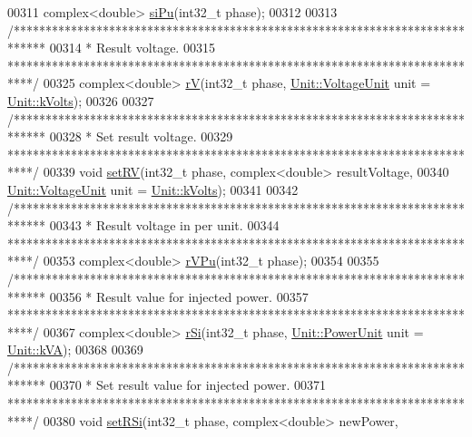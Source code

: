 \begin{DoxyCode}
00311   complex<double> \hyperlink{group___models_ga8ac94a6b5f69417da962a7d87361b416}{siPu}(int32\_t phase);
00312 
00313   \textcolor{comment}{/*****************************************************************************}
00314 \textcolor{comment}{   * Result voltage.}
00315 \textcolor{comment}{   ****************************************************************************/}
00325   complex<double> \hyperlink{group___models_ga2d1f6bfbd8abaf168bb75bd8e5cd9b5e}{rV}(int32\_t phase, \hyperlink{class_unit_a55b07dfa9457e1eca2c7194fe0cfc3c1}{Unit::VoltageUnit} unit = 
      \hyperlink{class_unit_a55b07dfa9457e1eca2c7194fe0cfc3c1aa54b2473993a702a3923525765bd6e4c}{Unit::kVolts});
00326 
00327   \textcolor{comment}{/*****************************************************************************}
00328 \textcolor{comment}{   * Set result voltage.}
00329 \textcolor{comment}{   ****************************************************************************/}
00339   \textcolor{keywordtype}{void} \hyperlink{group___models_ga2b2c5a373d87025e79d26aa9c4cea75a}{setRV}(int32\_t phase, complex<double> resultVoltage,
00340              \hyperlink{class_unit_a55b07dfa9457e1eca2c7194fe0cfc3c1}{Unit::VoltageUnit} unit = \hyperlink{class_unit_a55b07dfa9457e1eca2c7194fe0cfc3c1aa54b2473993a702a3923525765bd6e4c}{Unit::kVolts});
00341 
00342   \textcolor{comment}{/*****************************************************************************}
00343 \textcolor{comment}{   * Result voltage in per unit.}
00344 \textcolor{comment}{   ****************************************************************************/}
00353   complex<double> \hyperlink{group___models_ga7deee8820e2ee3e0db993a1e76b68700}{rVPu}(int32\_t phase);
00354 
00355   \textcolor{comment}{/*****************************************************************************}
00356 \textcolor{comment}{   * Result value for injected power.}
00357 \textcolor{comment}{   ****************************************************************************/}
00367   complex<double> \hyperlink{group___models_gac8ddd4cb566d995b70b0f83146aa12b3}{rSi}(int32\_t phase, \hyperlink{class_unit_ace265ae255370ccacfd5370337572c3b}{Unit::PowerUnit} unit = 
      \hyperlink{class_unit_ace265ae255370ccacfd5370337572c3ba72b181a842ae2759488a2fa1410d3696}{Unit::kVA});
00368 
00369   \textcolor{comment}{/*****************************************************************************}
00370 \textcolor{comment}{   * Set result value for injected power.}
00371 \textcolor{comment}{   ****************************************************************************/}
00380   \textcolor{keywordtype}{void} \hyperlink{group___models_ga36d3d54b66584a0557c0c141f4636d4c}{setRSi}(int32\_t phase, complex<double> newPower,

\end{DoxyCode}
